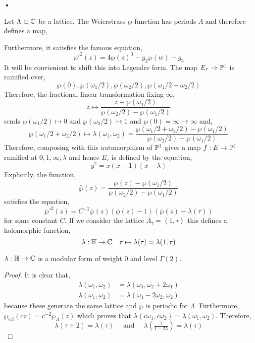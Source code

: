 \textit{•}\documentclass[12pt]{article}
\begin{document}
Let $\Lambda \subset \CC$ be a lattice. The Weierstrass $\wp$-function has periods $\Lambda$ 
and therefore defines a map,
\begin{center}
\end{center}
Furthermore, it satisfies the famous equation,
\[ \wp'^2(z) = 4 \wp(z)^3 - g_2 \wp(w) - g_3 \]
It will be convienient to shift this into Legendre form. The map $E_\tau \to \P^1$ is ramified over,
\[ \wp(0), \wp(\omega_1/2), \wp(\omega_2/2), \wp(\omega_1 / 2 + \omega_2 / 2) \]
Therefore, the fractional linear transformation fixing $\infty$,
\[ z \mapsto \frac{z - \wp(\omega_1/2)}{\wp(\omega_2/2) - \wp(\omega_1/2)} \]
sends $\wp(\omega_1/2) \mapsto 0$ and $\wp(\omega_2/2) \mapsto 1$ and $\wp(0) = \infty \mapsto \infty$ and,
\[ \wp(\omega_1/2 + \omega_2/2) \mapsto \lambda(\omega_1, \omega_2) = \frac{\wp(\omega_1/2+\omega_2/2) - \wp(\omega_1/2)}{\wp(\omega_2/2) - \wp(\omega_1/2)} \]
Therefore, composing with this automorphism of $\P^1$ gives a map $f : E \to \P^1$ ramified at $0,1,\infty, \lambda$ and hence $E_\tau$ is defined by the equation,
\[ y^2 = x(x-1)(x-\lambda) \]
Explicitly, the function,
\[ \bar{\wp}(z) = \frac{\wp(z) - \wp(\omega_1/2)}{\wp(\omega_2/2) - \wp(\omega_1/2)} \]
satisfies the equation, 
\[ \bar{\wp}'^2(z) = C^{-2} \bar{\wp}(z) (\bar{\wp}(z) - 1)(\bar{\wp}(z) - \lambda(\tau)) \]
for some constant $C$. If we consider the lattice $\Lambda_{\tau} = \left< 1, \tau \right>$ this defines a holomorphic function,
\[ \lambda : \bH \to \CC \quad \tau \mapsto \lambda(\tau) = \lambda(1, \tau) \]

\begin{prop}
$\lambda : \bH \to \CC$ is a modular form of weight $0$ and level $\Gamma(2)$. 
\end{prop}

\begin{proof}
It is clear that,
\begin{align*}
\lambda(\omega_1, \omega_2) &= \lambda(\omega_1, \omega_2 + 2 \omega_1)
\\
\lambda(\omega_1, \omega_2) & = \lambda(\omega_1 - 2 \omega_2, \omega_2) 
\end{align*} 
because these generate the same lattice and $\wp$ is periodic for $\Lambda$. Furthermore, $\wp_{c \Lambda}(cz) = c^{-2} \wp_{\Lambda}(z)$ which proves that $\lambda(c \omega_1, c \omega_2) = \lambda(\omega_1, \omega_2)$. Therefore, \[ \lambda(\tau + 2) = \lambda(\tau) \quad \text{ and } \quad \lambda \left(\tfrac{1}{1 - 2 \lambda} \right) = \lambda(\tau) \]
\end{proof}
\end{document}
